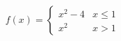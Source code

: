 \documentclass[preview]{standalone}
\begin{document}
\begin{align*}
f(x)=\begin{cases}x^2-4 & x \leq 1\\x^2 & x>1\end{cases}
\end{align*}
\end{document}
